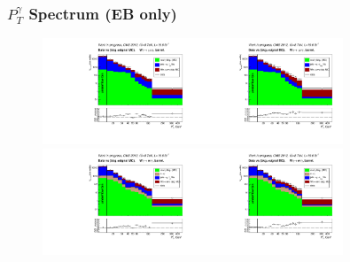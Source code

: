 \begin{frame}\frametitle{\footnotesize{$P_T^{\gamma}$ Spectrum (EB only)}}
   \begin{figure}[htb]
    \begin{center}
       \includegraphics[width=0.40\textwidth]{../figs/figs_v11/MUON_WGamma/PrepareYields/c_DATAvsBkgPlusSigMCc_MUON_WGamma_TEMPL_CHISO_UNblind__Barrel__phoEt.pdf}\includegraphics[width=0.40\textwidth]{../figs/figs_v11/MUON_WGamma/PrepareYields/c_DATAvsBkgPlusSigMCc_MUON_WGamma_TEMPL_SIHIH_UNblind__Barrel__phoEt.pdf}\\
       \includegraphics[width=0.40\textwidth]{../figs/figs_v11/ELECTRON_WGamma/PrepareYields/c_DATAvsBkgPlusSigMCc_ELECTRON_WGamma_TEMPL_CHISO_UNblind__Barrel__phoEt.pdf}\includegraphics[width=0.40\textwidth]{../figs/figs_v11/ELECTRON_WGamma/PrepareYields/c_DATAvsBkgPlusSigMCc_ELECTRON_WGamma_TEMPL_SIHIH_UNblind__Barrel__phoEt.pdf}\\
    \end{center}
  \end{figure}
\end{frame}%

